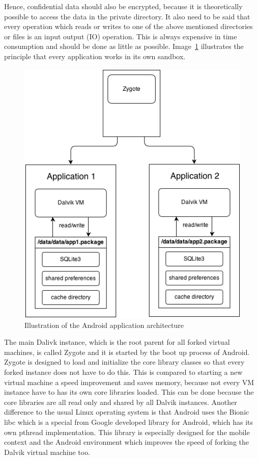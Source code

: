 Hence, confidential data should also be encrypted, because it is theoretically possible to access the data in the private directory.
It also need to be said that every operation which reads or writes to one of the above mentioned directories or files is an input output (IO) operation.
This is always expensive in time consumption and should be done as little as possible.
Image~\ref{fig:zygote-and-app} illustrates the principle that every application works in its own sandbox.\\
\begin{figure}[h]
\begin{center}
\includegraphics[scale=0.75]{images/zygote-and-app.png} 
\caption{Illustration of the Android application architecture}
\label{fig:zygote-and-app}
\end{center}
\end{figure}
\newpage
The main Dalivk instance, which is the root parent for all forked virtual machines, is called Zygote and it is started by the boot up process of Android.
Zygote is designed to load and initialize the core library classes so that every forked instance does not have to do this.
This is compared to starting a new virtual machine a speed improvement and saves memory, because not every VM instance have to has its own core libraries loaded.
This can be done because the core libraries are all read only and shared by all Dalvik instances.\cite{ehringer2010dalvik}
Another difference to the usual Linux operating system is that Android uses the Bionic libc which is a special from Google developed library for Android, which has its own pthread implementation.
This library is especially designed for the mobile context and the Android environment which improves the speed of forking the Dalvik virtual machine too.~\cite{brady2008android}

